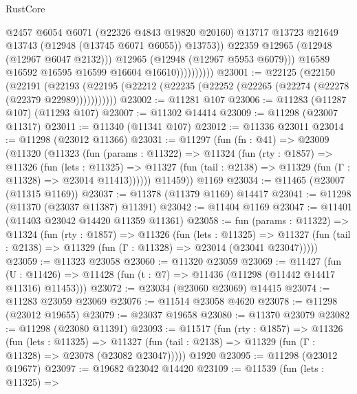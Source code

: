 \begin{lexlean}{RustCore}
\begin{coremodule}
                                @2457
                                @6054
                                @6071
                                (@22326 @4843 @19820 @20160)
                                @13717
                                @13723
                                @21649
                                @13743
                                (@12948 (@13745 @6071 @6055))
                                @13753))
                            @22359
                            @12965
                            (@12948 (@12967 @6047 @2132)))
                          @12965
                          (@12948 (@12967 @5953 @6079)))
                        @16589
                        @16592
                        @16595
                        @16599
                        @16604
                        @16610))))))))))
@23001 := @22125
    (@22150
      (@22191
        (@22193 (@22195 (@22212 (@22235 (@22252 (@22265 (@22274 (@22278 (@22379 @22989)))))))))))
@23002 := @11281 @107
@23006 := @11283 (@11287 @107) (@11293 @107)
@23007 := @11302 @14414
@23009 := @11298 (@23007 @11317)
@23011 := @11340 (@11341 @107)
@23012 := @11336 @23011
@23014 := @11298 (@23012 @11366)
@23031 := @11297
    (fun (fn : @41) =>
    @23009
      (@11320
        (@11323
          (fun (params : @11322) =>
          @11324
            (fun (rty : @1857) =>
            @11326
              (fun (lets : @11325) =>
              @11327 (fun (tail : @2138) => @11329 (fun (Γ : @11328) => @23014 @11413))))))
        @11459))
    @1169
@23034 := @11465 (@23007 (@11315 @1169))
@23037 := @11378 (@11379 @1169) @14417
@23041 := @11298 (@11370 (@23037 @11387) @11391)
@23042 := @11404 @1169
@23047 := @11401 (@11403 @23042 @14420 @11359 @11361)
@23058 := fun (params : @11322) =>
  @11324
    (fun (rty : @1857) =>
    @11326
      (fun (lets : @11325) =>
      @11327 (fun (tail : @2138) => @11329 (fun (Γ : @11328) => @23014 (@23041 @23047)))))
@23059 := @11323 @23058
@23060 := @11320 @23059
@23069 := @11427
    (fun (U : @11426) => @11428 (fun (t : @7) => @11436 (@11298 (@11442 @14417 @11316) @11453)))
@23072 := @23034 (@23060 @23069) @14415
@23074 := @11283 @23059 @23069
@23076 := @11514 @23058 @4620
@23078 := @11298 (@23012 @19655)
@23079 := @23037 @19658
@23080 := @11370 @23079
@23082 := @11298 (@23080 @11391)
@23093 := @11517
    (fun (rty : @1857) =>
    @11326
      (fun (lets : @11325) =>
      @11327 (fun (tail : @2138) => @11329 (fun (Γ : @11328) => @23078 (@23082 @23047)))))
    @1920
@23095 := @11298 (@23012 @19677)
@23097 := @19682 @23042 @14420
@23109 := @11539
    (fun (lets : @11325) =>

\end{coremodule}
\end{lexlean}
